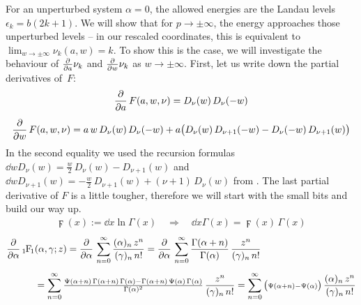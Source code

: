 For an unperturbed system $\alpha=0$, the allowed energies are the Landau levels $\epsilon_k = b(2k+1)$. We will show that for $p\to\pm\infty$, the energy approaches those unperturbed levels – in our rescaled coordinates, this is equivalent to $\lim_{w\to\pm\infty} \nu_k(a, w) = k$. To show this is the case, we will investigate the behaviour of $\frac{\partial }{\partial a} \nu_k$ and $\frac{\partial }{\partial w} \nu_k$ as $w \to \pm\infty$. First, let us write down the partial derivatives of~$F$:
\begin{gather*}
    \frac{\partial }{\partial a} \, F(a,w,\nu) = D_\nu(w) \, D_\nu(-w)
    \\[5pt]
    \frac{\partial }{\partial w} \, F(a,w,\nu)
    = a \, w \, D_\nu(w) \, D_\nu(-w)
    + a \big(
        D_\nu(w) \, D_{\nu + 1}(-w) - D_\nu(-w) \, D_{\nu+1}(w)
    \big)
\end{gather*}
In the second equality we used the recursion formulas $\dd{}{w} D_\nu(w) = \frac{w}{2} \, D_\nu(w) - D_{\nu+1}(w)$ and $\dd{}{w} D_{\nu+1}(w) = -\frac{w}{2} \, D_{\nu+1}(w) + (\nu+1) \, D_\nu(w)$ from \cite{GradshteynRyzhik}. The last partial derivative of $F$ is a little tougher, therefore we will start with the small bits and build our way up.
\begin{align*}
    \digamma(x) := \dd{}{x} \ln \Gamma(x)
    \quad \Longrightarrow \quad
    \dd{}{x} \Gamma(x) = \digamma(x) \, \Gamma(x)
\end{align*}
\begin{align*}
    \pd{}{\alpha} \, \hypF&(\alpha, \gamma; z)
    = \pd{}{\alpha} \, \sum_{n=0}^\infty \frac{(\alpha)_n \, z^n}{(\gamma)_n \, n!}
    = \pd{}{\alpha} \, \sum_{n=0}^\infty \frac{\Gamma(\alpha+n)}{\Gamma(\alpha)} \, \frac{z^n}{(\gamma)_n \, n!}
    \\[5pt]
    &= \sum_{n=0}^\infty \tfrac{\digamma(\alpha+n) \, \Gamma(\alpha+n) \, \Gamma(\alpha) - \Gamma(\alpha+n) \, \digamma(\alpha) \, \Gamma(\alpha)}{\Gamma(\alpha)^2} \, \frac{z^n}{(\gamma)_n \, n!}
    = \sum_{n=0}^\infty \big({ \scriptstyle \digamma(\alpha+n) - \digamma(\alpha) }\big) \, \frac{(\alpha)_n \, z^n}{(\gamma)_n \, n!}
\end{align*}
